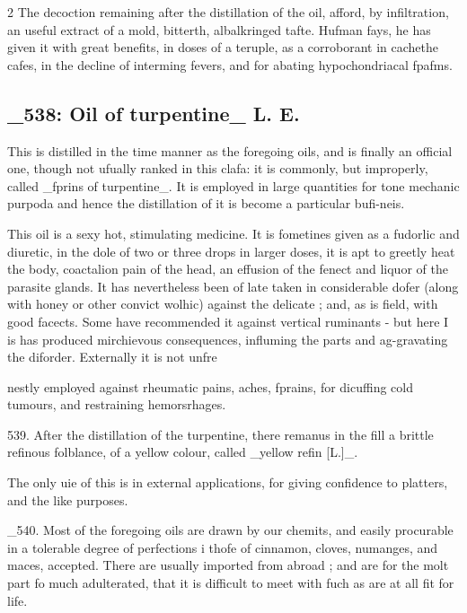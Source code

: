 \documentclass[10pt]{article}
\begin{document}
\begin{multicols}{2}
The decoction remaining after the distillation of the oil, afford, by infiltration, an useful extract of a mold, bitterth, albalkringed tafte. Hufman fays, he has given it with great benefits, in doses of a teruple, as a corroborant in cachethe cafes, in the decline of interming fevers, and for abating hypochondriacal fpafms.

\subsection*{\_538: Oil of turpentine\_ L. E.}
This is distilled in the time manner as the foregoing oils, and is finally an official one, though not ufually ranked in this clafa: it is commonly, but improperly, called \_fprins of turpentine\_. It is employed in large quantities for tone mechanic purpoda and hence the distillation of it is become a particular bufi-neis.

This oil is a sexy hot, stimulating medicine. It is fometines given as a fudorlic and diuretic, in the dole of two or three drops in larger doses, it is apt to greetly heat the body, coactalion pain of the head, an effusion of the fenect and liquor of the parasite glands. It has nevertheless been of late taken in considerable dofer (along with honey or other convict wolhic) against the delicate ; and, as is field, with good facects. Some have recommended it against vertical ruminants - but here I is has produced mirchievous consequences, influming the parts and ag-gravating the diforder. Externally it is not unfre

nestly employed against rheumatic pains, aches, fprains, for dicuffing cold tumours, and restraining hemorsrhages.

539. After the distillation of the turpentine, there remanus in the fill a brittle refinous folblance, of a yellow colour, called \_yellow refin [L.]\_.

The only uie of this is in external applications, for giving confidence to platters, and the like purposes.

\_540. Most of the foregoing oils are drawn by our chemits, and easily procurable in a tolerable degree of perfections i thofe of cinnamon, cloves, numanges, and maces, accepted. There are usually imported from abroad ; and are for the molt part fo much adulterated, that it is difficult to meet with fuch as are at all fit for life.


\end{multicols}
\end{document}
